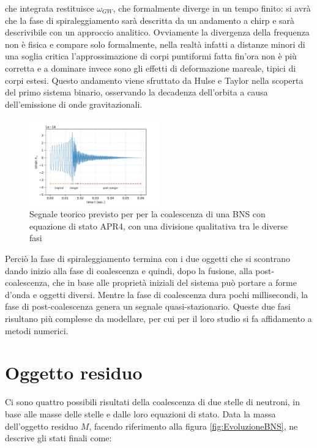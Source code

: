che integrata restituisce $\omega_{GW}$, che formalmente diverge in un tempo finito: si avrà che la fase di spiraleggiamento sarà descritta da un andamento a chirp e sarà descrivibile con un approccio analitico. Ovviamente la divergenza della frequenza non è fisica e compare solo formalmente, nella realtà infatti a distanze minori di una soglia critica l'approssimazione di corpi puntiformi fatta fin'ora non è più corretta e a dominare invece sono gli effetti di deformazione mareale, tipici di corpi estesi. Questo andamento viene sfruttato da Hulse e Taylor nella scoperta del primo sistema binario, osservando la decadenza dell'orbita a causa dell'emissione di onde gravitazionali.
\begin{figure}
	\vspace{-20pt}
	\begin{center}
		\includegraphics[width=0.5\textwidth]{figures/Capitolo_1/APR4.pdf}
	\end{center}
	\vspace{-10pt}
	\caption{Segnale teorico previsto per per la coalescenza di una BNS con equazione di stato APR4, con una divisione qualitativa tra le diverse fasi}
	\label{fig:forma_onda_APR4}
	\vspace{-50pt}
\end{figure}
Perciò la fase di spiraleggiamento termina con i due oggetti che si scontrano dando inizio alla fase di coalescenza e quindi, dopo la fusione, alla post-coalescenza, che in base alle proprietà iniziali del sistema può portare a forme d'onda e oggetti diversi.	Mentre la fase di coalescenza dura pochi millisecondi, la fase di post-coalescenza genera un segnale quasi-stazionario. Queste due fasi risultano più complesse da modellare, per cui per il loro studio si fa affidamento a metodi numerici. \cite{maggiore2008gravitational}
\section{Oggetto residuo}
\label{section:residual}
Ci sono quattro possibili risultati della coalescenza di due stelle di neutroni, in base alle masse delle stelle e dalle loro equazioni di stato. 
Data la massa dell'oggetto residuo $M$, facendo riferimento alla figura \ref{fig:EvoluzioneBNS}, \cite{sarin2020evolution} ne descrive gli stati finali come:

